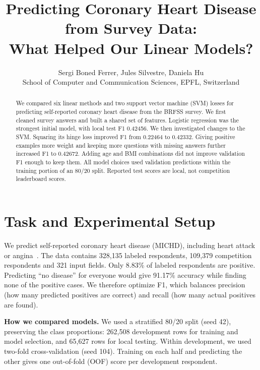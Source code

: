 \documentclass[10pt,conference,compsocconf,a4paper]{latex-example-paper/IEEEtran}
\begin{document}
\title{Predicting Coronary Heart Disease from Survey Data:\\
What Helped Our Linear Models?}
\author{Sergi Boned Ferrer, Jules Silvestre, Daniela Hu\\
School of Computer and Communication Sciences, EPFL, Switzerland}
\maketitle

\begin{abstract}
We compared six linear methods and two support vector machine (SVM) losses
for predicting self-reported coronary heart disease from the BRFSS survey.
We first cleaned survey answers and built a shared set of features.
Logistic regression was the strongest initial model, with local test F1
0.42456. We then investigated changes to the SVM. Squaring its hinge loss
improved F1 from 0.22464 to 0.42332. Giving positive examples more weight
and keeping more questions with missing answers further increased F1 to
0.42672. Adding age and BMI combinations did not improve validation F1
enough to keep them. All model choices used validation predictions within
the training portion of an 80/20 split. Reported test scores are local,
not competition leaderboard scores.
\end{abstract}

\section{Task and Experimental Setup}
We predict self-reported coronary heart disease (MICHD), including heart
attack or angina~\cite{project}. The data contains 328{,}135 labeled respondents, 109{,}379 competition
respondents and 321 input fields. Only 8.83\% of labeled respondents are
positive. Predicting ``no disease'' for everyone would give 91.17\%
accuracy while finding none of the positive cases. We therefore optimize
F1, which balances precision (how many predicted positives are correct)
and recall (how many actual positives are found).

\textbf{How we compared models.} We used a stratified 80/20 split
(seed 42), preserving the class proportions: 262{,}508 development rows
for training and model selection, and 65{,}627 rows for local testing.
Within development, we used two-fold cross-validation (seed 104).
Training on each half and predicting the other gives one out-of-fold
(OOF) score per development respondent.
\end{document}
